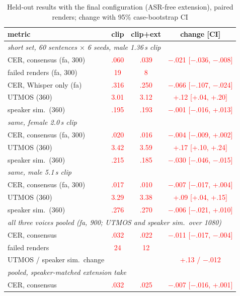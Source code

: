 \documentclass[conference]{IEEEtran}
\newcommand{\RES}[1]{\textcolor{red}{#1}}
\begin{document}
\begin{table}[t]
\caption{Held-out results with the final configuration (ASR-free extension), paired renders; change with
95\% case-bootstrap CI}\label{tab:held}
\centering
\setlength{\tabcolsep}{2.5pt}
\begin{tabular}{lccc}
\toprule
metric & clip & clip+ext & change [CI] \\
\midrule
\multicolumn{4}{l}{\emph{short set, 60 sentences $\times$ 6 seeds, male 1.36\,s clip}} \\
CER, consensus (fa, 300) & \RES{.060} & \RES{.039} & \RES{$-$.021 [$-$.036, $-$.008]} \\
failed renders (fa, 300) & \RES{19} & \RES{8} & \\
CER, Whisper only (fa) & \RES{.316} & \RES{.250} & \RES{$-$.066 [$-$.107, $-$.024]} \\
UTMOS (360) & \RES{3.01} & \RES{3.12} & \RES{+.12 [+.04, +.20]} \\
speaker sim.\ (360) & \RES{.195} & \RES{.193} & \RES{$-$.001 [$-$.016, +.013]} \\
\multicolumn{4}{l}{\emph{same, female 2.0\,s clip}} \\
CER, consensus (fa, 300) & \RES{.020} & \RES{.016} & \RES{$-$.004 [$-$.009, +.002]} \\
UTMOS (360) & \RES{3.42} & \RES{3.59} & \RES{+.17 [+.10, +.24]} \\
speaker sim.\ (360) & \RES{.215} & \RES{.185} & \RES{$-$.030 [$-$.046, $-$.015]} \\
\multicolumn{4}{l}{\emph{same, male 5.1\,s clip}} \\
CER, consensus (fa, 300) & \RES{.017} & \RES{.010} & \RES{$-$.007 [$-$.017, +.004]} \\
UTMOS (360) & \RES{3.29} & \RES{3.38} & \RES{+.09 [+.04, +.15]} \\
speaker sim.\ (360) & \RES{.276} & \RES{.270} & \RES{$-$.006 [$-$.021, +.010]} \\
\multicolumn{4}{l}{\emph{all three voices pooled (fa, 900; UTMOS and speaker sim.\ over 1080)}} \\
CER, consensus & \RES{.032} & \RES{.022} & \RES{$-$.011 [$-$.017, $-$.004]} \\
failed renders & \RES{24} & \RES{12} & \\
UTMOS / speaker sim.\ change & & & \RES{+.13 / $-$.012} \\
\multicolumn{4}{l}{\emph{pooled, speaker-matched extension take}} \\
CER, consensus & \RES{.032} & \RES{.025} & \RES{$-$.007 [$-$.016, +.001]} \\

\end{tabular}
\end{table}
\end{document}
